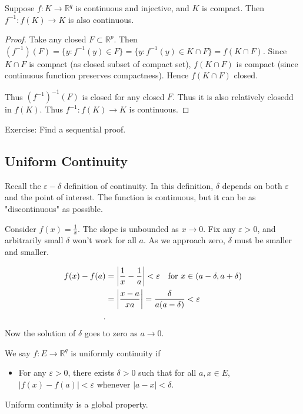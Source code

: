 
\begin{theorem}
	Suppose $f: K \to \mathbb{R}^q$ is continuous and injective, and $K$ is compact. Then $f^{-1} : f(K) \to K$ is also continuous.
\end{theorem}
\begin{proof}
	Take any closed $F \subset \mathbb{R}^p$. Then $(f^{-1})(F) = \{y: f^{-1} (y) \in F\} = \{y: f^{-1} (y) \in K \cap F\} =  f(K \cap F)$. Since $K \cap F$ is compact (as closed subset of compact set), $f(K \cap F)$ is compact (since continuous function preserves compactness). Hence $f(K \cap F)$ closed.

	Thus $(f^{-1} )^{-1}(F)$ is closed for any closed $F$. Thus it is also relatively closedd in $f(K)$. Thus $f^{-1} : f(K) \to K$ is continuous.
\end{proof}
Exercise: Find a sequential proof.

\subsection{Uniform Continuity}

Recall the $\varepsilon-\delta$ definition of continuity. In this definition, $\delta$ depends on both $\varepsilon$ and the point of interest. The function is continuous, but it can be as "discontinuous" as possible.

\begin{example}
	Consider $f(x) = \frac{1}{x}$. The slope is unbounded as $x\to 0$. Fix any $\varepsilon>0$, and arbitrarily small  $\delta$ won't work for all $a$. As we approach zero, $\delta$ must be smaller and smaller.

	\begin{align*}
		f(x) - f(a) &= \left| \frac{1}{x} - \frac{1}{a} \right|< \varepsilon \text{\quad for } x \in (a-\delta, a+\delta)\\
		&= \left| \frac{x-a}{xa} \right| = \frac{\delta}{a (a-\delta)}<\varepsilon \\
	.\end{align*}
	Now the solution of  $\delta$ goes to zero as $a \to 0$.
\end{example}



\begin{definition}
	We say $f: E \to \mathbb{R}^q$ is uniformly continuity if
	\begin{itemize}
		\item For any $\varepsilon>0$, there exists $\delta>0$ such that for all $a, x \in E$, $\left| f(x) - f(a) \right| < \varepsilon$ whenever $|a - x| < \delta$.
	\end{itemize}
\end{definition}
\begin{remark}
	Uniform continuity is a global property.
\end{remark}


